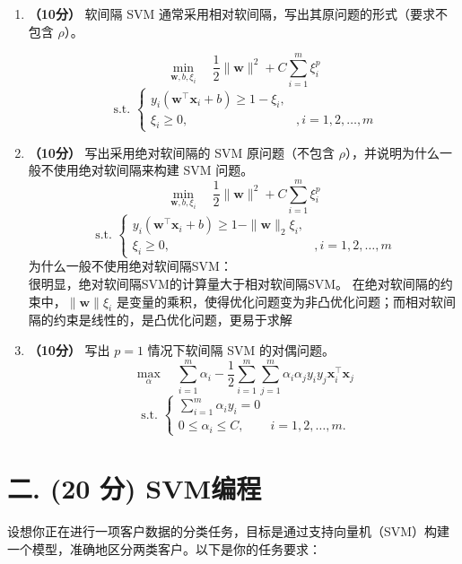 \documentclass[8pt]{article}
\begin{document}
\begin{enumerate}
    \item \textbf{（10分）} 软间隔 SVM 通常采用相对软间隔，写出其原问题的形式（要求不包含 \( \rho \)）。

\[ \min_{\mathbf{w}, b, {\xi_i}} \quad \frac{1}{2} \|\mathbf{w}\|^2 + C \sum_{i=1}^{m} \xi_i^{p}  \]
\[\text{ s.t. }
    \begin{cases} 
        y_i (\mathbf{w}^\top \mathbf{x}_i + b ) \geq 1 - \xi_i, 
        &\\
        \xi_i \geq 0, 
        & , i = 1, 2, \dots, m
    \end{cases} 
\]
    \item \textbf{（10分）} 写出采用绝对软间隔的 SVM 原问题（不包含 \( \rho \)），并说明为什么一般不使用绝对软间隔来构建 SVM 问题。
\[ \min_{\mathbf{w}, b, {\xi_i}}\quad  
    \frac{1}{2} \|\mathbf{w}\|^2 + C  \sum_{i=1}^{m} \xi_i^{p} 
\]
\[\text{ s.t. }
    \begin{cases} 
        y_i (\mathbf{w}^\top \mathbf{x}_i + b ) \geq 1 - \|\mathbf{w}\|_2 \xi_i, 
        &\\
        \xi_i \geq 0, 
        & , i = 1, 2, \dots, m
    \end{cases} 
\]
{\color{blue}为什么一般不使用绝对软间隔SVM：} \\
很明显，绝对软间隔SVM的计算量大于相对软间隔SVM。
在绝对软间隔的约束中，\(\|\mathbf{w}\|\xi_i\) 是变量的乘积，使得优化问题变为非凸优化问题；而相对软间隔的约束是线性的，是凸优化问题，更易于求解
    \item \textbf{（10分）} 写出 \( p = 1 \) 情况下软间隔 SVM 的对偶问题。
    \[
    \max_{\alpha} \quad \sum_{i=1}^{m} \alpha_i - \frac{1}{2} \sum_{i=1}^{m} \sum_{j=1}^{m} \alpha_i \alpha_j y_i y_j \mathbf{x}_i^\top \mathbf{x}_j
    \]
    \[\text{ s.t. }
        \begin{cases}
            \sum_{i=1}^{m} \alpha_i y_i = 0 \\
            0 \leq \alpha_i \leq C, & i = 1, 2, \dots, m.
        \end{cases}
    \]
\end{enumerate}

\vspace{3em}

\section*{二. (20 分) SVM编程}
设想你正在进行一项客户数据的分类任务，目标是通过支持向量机（SVM）构建一个模型，准确地区分两类客户。以下是你的任务要求：
\end{document}
